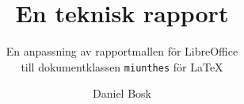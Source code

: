 \documentclass[a4paper,knd,final]{miunthes} %
\title{En teknisk rapport}
\subtitle{En anpassning av rapportmallen för LibreOffice\\
till dokumentklassen \texttt{miunthes} för \LaTeX}
\author{Daniel Bosk}
\begin{document}
	\begin{titlingpage}
		\maketitle
	\end{titlingpage}
	\frontmatter
	
	\cleardoublepage
	
	\cleardoublepage
	
	\cleardoublepage
	\tableofcontents
	\cleardoublepage
	\listoffigures
	\cleardoublepage
	\listoftables
	\cleardoublepage
	\printnomenclature

	\mainmatter
	
	
	
	
	
	
	

	

	\appendix
	

	\backmatter
\end{document}
